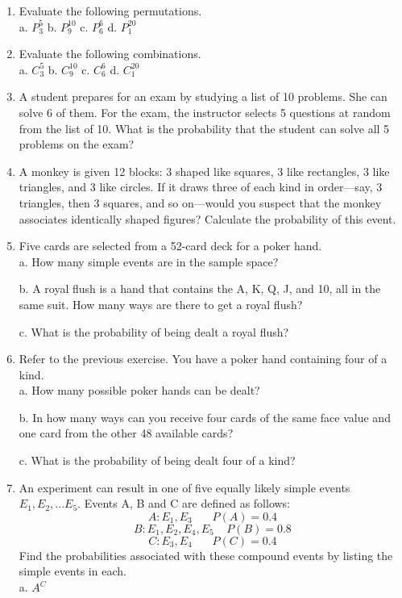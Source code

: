 \documentclass{article}
\begin{document}
\begin{enumerate}
\item Evaluate the following permutations. \\

 a. $P_3^5$    b. $P_9^{10}$    c. $P_6^6$    d. $P_1^{20}$ \\

\item Evaluate the following combinations. \\

 a. $C_3^5$    b. $C_9^{10}$    c. $C_6^6$    d. $C_1^{20}$ \\

\item A student prepares for an exam by studying a list of 10 problems. She can solve 6 of them. For the exam, the instructor selects 5 questions at random from the list of 10. What is the probability that the student can solve all 5 problems on the exam?

\item A monkey is given 12 blocks: 3 shaped like squares, 3 like rectangles, 3 like triangles, and 3 like circles. If it draws three of each kind in order—say, 3 triangles, then 3 squares, and so on—would you suspect that the monkey associates identically shaped figures? Calculate the probability of this event.

\item Five cards are selected from a 52-card deck for a poker hand. \\ 
a. How many simple events are in the sample space?

b. A royal flush is a hand that contains the A, K, Q, J, and 10, all in the same suit. How many ways are there to get a royal flush?

c. What is the probability of being dealt a royal flush?

\item Refer to the previous exercise. You have a poker hand containing four of a kind. \\ 
a. How many possible poker hands can be dealt?

b. In how many ways can you receive four cards of the same face value and one card from the other 48 available cards?

c. What is the probability of being dealt four of a kind?

\item An experiment can result in one of five equally likely simple events $E_1,E_2,...E_5.$ Events A, B and C are defined as follows: \\ 
$$ A:E_1,E_3 \:\:\:\:\:\:\:\: P(A) = 0.4 $$
$$ B:E_1,E_2,E_4,E_5 \:\:\:\:\: P(B) = 0.8 $$
$$ C:E_3,E_4 \:\:\:\:\:\:\:\: P(C) = 0.4 $$
Find the probabilities associated with these compound events by listing the simple events in each. \\
a. $A^C$


\end{enumerate}
\end{document}
